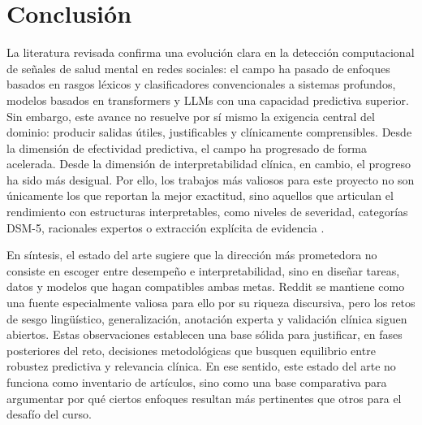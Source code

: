 \section{Conclusión}

La literatura revisada confirma una evolución clara en la detección computacional de señales de salud mental en redes sociales: el campo ha pasado de enfoques basados en rasgos léxicos y clasificadores convencionales a sistemas profundos, modelos basados en transformers y LLMs con una capacidad predictiva superior. Sin embargo, este avance no resuelve por sí mismo la exigencia central del dominio: producir salidas útiles, justificables y clínicamente comprensibles. Desde la dimensión de efectividad predictiva, el campo ha progresado de forma acelerada. Desde la dimensión de interpretabilidad clínica, en cambio, el progreso ha sido más desigual. Por ello, los trabajos más valiosos para este proyecto no son únicamente los que reportan la mejor exactitud, sino aquellos que articulan el rendimiento con estructuras interpretables, como niveles de severidad, categorías DSM-5, racionales expertos o extracción explícita de evidencia \citep{gaur2018dsm5, gaur2019severity, bao2025redsm5, singh2024evidence}.

En síntesis, el estado del arte sugiere que la dirección más prometedora no consiste en escoger entre desempeño e interpretabilidad, sino en diseñar tareas, datos y modelos que hagan compatibles ambas metas. Reddit se mantiene como una fuente especialmente valiosa para ello por su riqueza discursiva, pero los retos de sesgo lingüístico, generalización, anotación experta y validación clínica siguen abiertos. Estas observaciones establecen una base sólida para justificar, en fases posteriores del reto, decisiones metodológicas que busquen equilibrio entre robustez predictiva y relevancia clínica. En ese sentido, este estado del arte no funciona como inventario de artículos, sino como una base comparativa para argumentar por qué ciertos enfoques resultan más pertinentes que otros para el desafío del curso.

